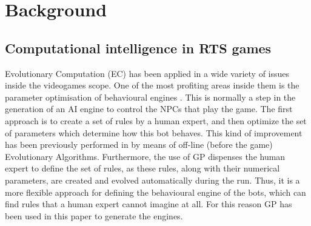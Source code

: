 \documentclass[conference]{IEEEtran}
\begin{document}
%
\section{Background}

\subsection{Computational intelligence in RTS games}
\label{subsec:soa}

Evolutionary Computation (EC) has been applied in a wide variety of issues inside the videogames scope. One of the most profiting areas inside them is the parameter optimisation of behavioural engines \cite{Mora-Evo2010,cooperativebots_CIG2010,Genebot-IWANN2011}.
%
%
This is normally a step in the generation of an AI engine to control the NPCs that play the game. The first approach is to create a set of rules by a human expert, and then optimize the set of parameters which determine how this bot behaves. This kind of improvement has been previously performed in \cite{Genebot_CEC11,genebot-evo12,Genebot_CIG2012,CarSetup} by means of off-line (before the game) Evolutionary Algorithms.
Furthermore, the use of GP \cite{GarciaGP14,EsparciaGP2013} dispenses the human expert to define the set of rules, as these rules, along with their numerical parameters, are created and evolved automatically during the run.  Thus, it is a more flexible approach for defining the behavioural engine of the bots, which can find rules that a human expert cannot imagine at all. For this reason GP has been used in this paper to generate the engines.

\end{document}
